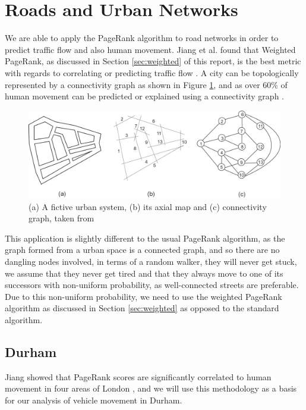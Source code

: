 \documentclass[11pt]{report}
\begin{document}

\section{Roads and Urban Networks} \label{sec:Roads}
We are able to apply the PageRank algorithm to road networks in order to predict traffic flow and also human movement. Jiang et al. found that Weighted PageRank, as discussed in Section \ref{sec:weighted} of this report, is the best metric with regards to correlating or predicting traffic flow \cite{1742-5468-2008-07-P07008}. A city can be topologically represented by a connectivity graph as shown in Figure \ref{city rep}, and as over 60\% of human movement can be predicted or explained using a connectivity graph \cite{doi:10.1080/13658810802022822}.

\begin{figure}[h]
\centering
\includegraphics[width=\linewidth]{map_view.jpeg}
\caption{(a) A fictive urban system, (b) its axial map and (c) connectivity graph, taken from \cite{doi:10.1080/13658810802022822}}
\label{city rep}
\end{figure}

This application is slightly different to the usual PageRank algorithm, as the graph formed from a urban space is a connected graph, and so there are no dangling nodes involved, in terms of a random walker, they will never get stuck, we assume that they never get tired and that they always move to one of its successors with non-uniform probability, as well-connected streets are preferable. Due to this non-uniform probability, we need to use the weighted PageRank algorithm as discussed in Section \ref{sec:weighted} as opposed to the standard algorithm.



\subsection{Durham}
Jiang showed that PageRank scores are significantly correlated to human movement in four areas of London \cite{doi:10.1080/13658810802022822}, and we will use this methodology as a basis for our analysis of vehicle movement in Durham. 
\end{document}
